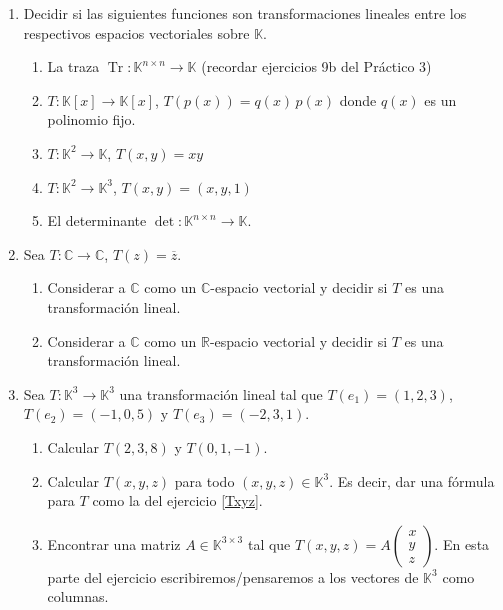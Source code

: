 \begin{enumerate}[topsep=6pt, itemsep=.4cm]
\item Decidir si las siguientes funciones son transformaciones lineales entre los respectivos espacios vectoriales sobre $\mathbb{K}$.
\begin{enumerate}[resume, topsep=5pt,itemsep=5pt]
 \item La traza $\operatorname{Tr}:\mathbb{K}^{n\times n}\longrightarrow\mathbb{K}$ (recordar ejercicios 9b del Práctico 3) 
 \item $T:\mathbb{K}[x]\longrightarrow\mathbb{K}[x]$, $T(p(x))=q(x)\,p(x)$ donde $q(x)$ es un polinomio fijo.
 \item $T:\mathbb{K}^2\longrightarrow\mathbb{K}$, $T(x,y)=xy$
 \item $T:\mathbb{K}^2\longrightarrow\mathbb{K}^3$, $T(x,y)=(x,y,1)$
 \item El determinante $\operatorname{det}:\mathbb{K}^{n\times n}\longrightarrow\mathbb{K}$.
\end{enumerate}


\item Sea $T:\mathbb{C}\longrightarrow\mathbb{C}$, $T(z)=\overline{z}$.
\begin{enumerate}
 \item Considerar a $\mathbb{C}$ como un $\mathbb{C}$-espacio vectorial y decidir si $T$ es una transformación lineal.
 \item Considerar a $\mathbb{C}$ como un $\mathbb{R}$-espacio vectorial y decidir si $T$ es una transformación lineal.
\end{enumerate}


\item\label{T en la base} Sea $T:\mathbb{K}^3\longrightarrow\mathbb{K}^3$ una transformación lineal tal que $T(e_1)=(1,2,3)$, $T(e_2)=(-1,0,5)$ y $T(e_3)=(-2,3,1)$. 
    \begin{enumerate}
     \item Calcular $T(2,3,8)$ y $T(0,1,-1)$. 
     \item\label{T en la base b} Calcular $T(x,y,z)$ para todo $(x,y,z)\in\mathbb{K}^3$. Es decir, dar una fórmula para $T$ como la del ejercicio     \ref{Txyz}.
     \item\label{matriz otro}  Encontrar una matriz $A\in\mathbb{K}^{3\times3}$ tal que
     $T(x,y,z)=A\left(\begin{matrix}
    x\\y\\z \end{matrix}
    \right)$. En esta parte del ejercicio escribiremos/pensaremos a los vectores de $\mathbb{K}^3$ como columnas.
    \end{enumerate}


\end{enumerate}
